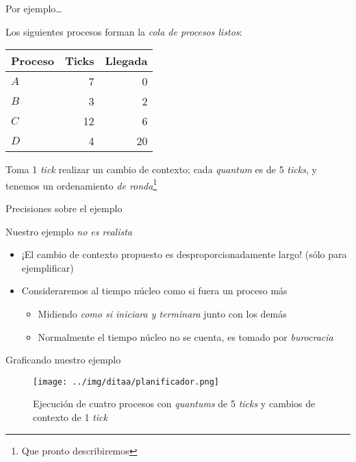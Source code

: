 \documentclass[presentation]{beamer}
\begin{document}
\begin{frame}[label={sec:org0d20553}]{Por ejemplo\ldots{}}
\begin{center}
Los siguientes procesos forman la \emph{cola de procesos listos}:

\begin{center}
\begin{tabular}{lrr}
\hline
Proceso & Ticks & Llegada\\
\hline
\(A\) & 7 & 0\\
\(B\) & 3 & 2\\
\(C\) & 12 & 6\\
\(D\) & 4 & 20\\
\hline
\end{tabular}
\end{center}

Toma 1 \emph{tick} realizar un cambio de contexto; cada \emph{quantum} es de 5
\emph{ticks}, y tenemos un ordenamiento \emph{de ronda}\footnote{Que pronto describiremos}
\end{center}
\end{frame}

\begin{frame}[label={sec:org680d860}]{Precisiones sobre el ejemplo}
\begin{center}
Nuestro ejemplo \emph{no es realista}
\end{center}
\begin{itemize}
\item ¡El cambio de contexto propuesto es desproporcionadamente largo!
(sólo para ejemplificar)
\item Consideraremos al tiempo núcleo como si fuera un proceso más
\begin{itemize}
\item Midiendo \emph{como si iniciara y terminara} junto con los demás
\item Normalmente el tiempo núcleo no se cuenta, es tomado por
\emph{burocracia}
\end{itemize}
\end{itemize}
\end{frame}

\begin{frame}[label={sec:orge57bb1f}]{Graficando nuestro ejemplo}
\begin{figure}[htbp]
\centering
\texttt{[image: ../img/ditaa/planificador.png]}
\caption{Ejecución de cuatro procesos con \emph{quantums} de 5 \emph{ticks} y cambios de contexto de 1 \emph{tick}}
\end{figure}
\end{frame}
\end{document}
